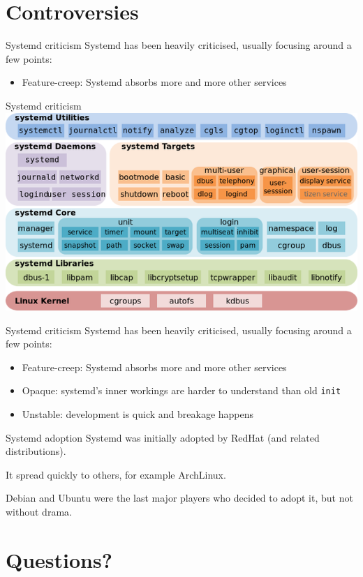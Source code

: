\documentclass[14pt]{beamer}
\begin{document}
\section{Controversies}

\begin{frame}{Systemd criticism}
  Systemd has been heavily criticised, usually focusing around a few points:
  \begin{itemize}
  \item Feature-creep: Systemd absorbs more and more other services
  \end{itemize}
\end{frame}

\begin{frame}{Systemd criticism}
  \includegraphics[keepaspectratio=true,width=\textwidth]{systemdcomponents.png}
\end{frame}

\begin{frame}{Systemd criticism}
  Systemd has been heavily criticised, usually focusing around a few points:
  \begin{itemize}
  \item Feature-creep: Systemd absorbs more and more other services
  \item Opaque: systemd's inner workings are harder to understand than old \texttt{init}
  \item Unstable: development is quick and breakage happens
  \end{itemize}
\end{frame}

\begin{frame}{Systemd adoption}
  Systemd was initially adopted by RedHat (and related distributions).

  It spread quickly to others, for example ArchLinux.

  Debian and Ubuntu were the last major players who decided to adopt it, but not without drama.
\end{frame}

\section{Questions?}
\end{document}
